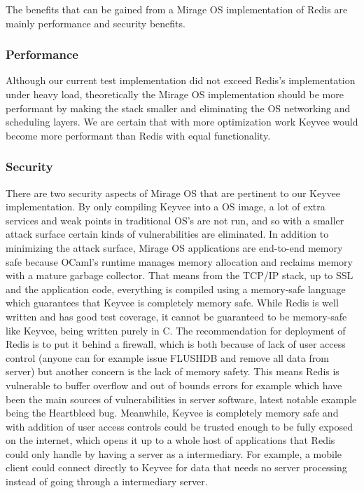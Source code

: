 \documentclass[english,10pt,twocolumn]{article}
\begin{document}
The benefits that can be gained from a Mirage OS implementation of Redis are mainly performance and security benefits.

\subsubsection{Performance}

Although our current test implementation did not exceed Redis's implementation under heavy load, theoretically the Mirage OS implementation should be more performant by making the stack smaller and eliminating the OS networking and scheduling layers. We are certain that with more optimization work Keyvee would become more performant than Redis with equal functionality.

\subsubsection{Security}

There are two security aspects of Mirage OS that are pertinent to our Keyvee implementation.
By only compiling Keyvee into a OS image, a lot of extra services and weak points in traditional OS's are not run, and so with a smaller attack surface certain kinds of vulnerabilities are eliminated.
In addition to minimizing the attack surface, Mirage OS applications are end-to-end memory safe because OCaml's runtime manages memory allocation and reclaims memory with a mature garbage collector.
That means from the TCP/IP stack, up to SSL and the application code, everything is compiled using a memory-safe language which guarantees that Keyvee is completely memory safe.
While Redis is well written and has good test coverage, it cannot be guaranteed to be memory-safe like Keyvee, being written purely in C.
The recommendation for deployment of Redis is to put it behind a firewall, which is both because of lack of user access control (anyone can for example issue FLUSHDB and remove all data from server) but another concern is the lack of memory safety.
This means Redis is vulnerable to buffer overflow and out of bounds errors for example which have been the main sources of vulnerabilities in server software, latest notable example being the Heartbleed bug.
Meanwhile, Keyvee is completely memory safe and with addition of user access controls could be trusted enough to be fully exposed on the internet, which opens it up to a whole host of applications that Redis could only handle by having a server as a intermediary.
For example, a mobile client could connect directly to Keyvee for data that needs no server processing instead of going through a intermediary server.
\end{document}
